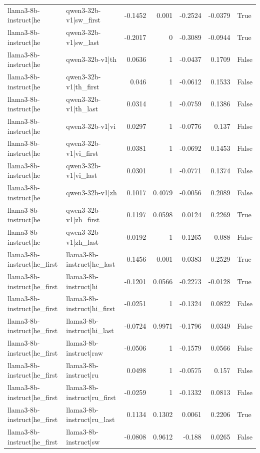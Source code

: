 \begin{table}
\begin{tabular}{l l r r r r l}
llama3-8b-instruct|he & qwen3-32b-v1|sw_first & -0.1452 & 0.001 & -0.2524 & -0.0379 & True \\
llama3-8b-instruct|he & qwen3-32b-v1|sw_last & -0.2017 & 0 & -0.3089 & -0.0944 & True \\
llama3-8b-instruct|he & qwen3-32b-v1|th & 0.0636 & 1 & -0.0437 & 0.1709 & False \\
llama3-8b-instruct|he & qwen3-32b-v1|th_first & 0.046 & 1 & -0.0612 & 0.1533 & False \\
llama3-8b-instruct|he & qwen3-32b-v1|th_last & 0.0314 & 1 & -0.0759 & 0.1386 & False \\
llama3-8b-instruct|he & qwen3-32b-v1|vi & 0.0297 & 1 & -0.0776 & 0.137 & False \\
llama3-8b-instruct|he & qwen3-32b-v1|vi_first & 0.0381 & 1 & -0.0692 & 0.1453 & False \\
llama3-8b-instruct|he & qwen3-32b-v1|vi_last & 0.0301 & 1 & -0.0771 & 0.1374 & False \\
llama3-8b-instruct|he & qwen3-32b-v1|zh & 0.1017 & 0.4079 & -0.0056 & 0.2089 & False \\
llama3-8b-instruct|he & qwen3-32b-v1|zh_first & 0.1197 & 0.0598 & 0.0124 & 0.2269 & True \\
llama3-8b-instruct|he & qwen3-32b-v1|zh_last & -0.0192 & 1 & -0.1265 & 0.088 & False \\
llama3-8b-instruct|he_first & llama3-8b-instruct|he_last & 0.1456 & 0.001 & 0.0383 & 0.2529 & True \\
llama3-8b-instruct|he_first & llama3-8b-instruct|hi & -0.1201 & 0.0566 & -0.2273 & -0.0128 & True \\
llama3-8b-instruct|he_first & llama3-8b-instruct|hi_first & -0.0251 & 1 & -0.1324 & 0.0822 & False \\
llama3-8b-instruct|he_first & llama3-8b-instruct|hi_last & -0.0724 & 0.9971 & -0.1796 & 0.0349 & False \\
llama3-8b-instruct|he_first & llama3-8b-instruct|raw & -0.0506 & 1 & -0.1579 & 0.0566 & False \\
llama3-8b-instruct|he_first & llama3-8b-instruct|ru & 0.0498 & 1 & -0.0575 & 0.157 & False \\
llama3-8b-instruct|he_first & llama3-8b-instruct|ru_first & -0.0259 & 1 & -0.1332 & 0.0813 & False \\
llama3-8b-instruct|he_first & llama3-8b-instruct|ru_last & 0.1134 & 0.1302 & 0.0061 & 0.2206 & True \\
llama3-8b-instruct|he_first & llama3-8b-instruct|sw & -0.0808 & 0.9612 & -0.188 & 0.0265 & False \\

\end{tabular}
\end{table}
